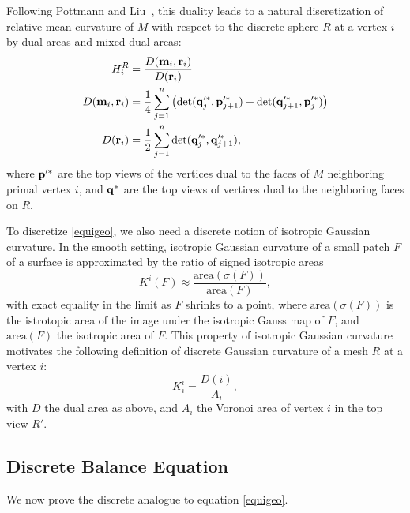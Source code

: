 \documentclass[annual]{acmsiggraph}
\begin{document}
Following Pottmann and Liu~, this duality leads to a natural discretization of relative mean curvature of $M$ with respect to the discrete sphere $R$ at a vertex $i$ by dual areas and mixed dual areas:
\begin{align*}
H^R_i &= \frac{D({\mathbf m}_i, {\mathbf r}_i)}{D({\mathbf r}_i)}\\
D({\mathbf m}_i,{\mathbf r}_i) &= \frac{1}{4}\sum_{j=1}^n \left( \det({\mathbf q}'^*_j, {\mathbf p}'^*_{j+1}) + \det({\mathbf q}'^*_{j+1}, {\mathbf p}'^*_j)\right)\\
D({\mathbf r}_i) &= \frac{1}{2}\sum_{j=1}^n \det({\mathbf q}'^*_j, {\mathbf q}'^*_{j+1}),
\end{align*}
where ${\mathbf p}'^*$ are the top views of the vertices dual to the faces of $M$ neighboring primal vertex $i$, and ${\mathbf q}^*$ are the top views of vertices dual to the neighboring faces on $R$.

To discretize \eqref{equigeo}, we also need a discrete notion of isotropic Gaussian curvature. In the smooth setting, isotropic Gaussian curvature of a small patch $F$ of a surface is approximated by the ratio of signed isotropic areas
\begin{equation*}
K^i(F) \approx \frac{\textrm{area}(\sigma(F))}{\textrm{area}(F)},
\end{equation*}
with exact equality in the limit as $F$ shrinks to a point, where $\textrm{area}(\sigma(F))$ is the istrotopic area of the image under the isotropic Gauss map of $F$, and $\textrm{area}(F)$ the isotropic area of $F$. This property of isotropic Gaussian curvature motivates the following definition of discrete Gaussian curvature of a mesh $R$ at a vertex $i$:
\begin{equation*}
K^i_i = \frac{D(i)}{A_i},
\end{equation*}
with $D$ the dual area as above, and $A_i$ the Voronoi area of vertex $i$ in the top view $R'$.

\subsection{Discrete Balance Equation}
We now prove the discrete analogue to equation \eqref{equigeo}.
\end{document}
